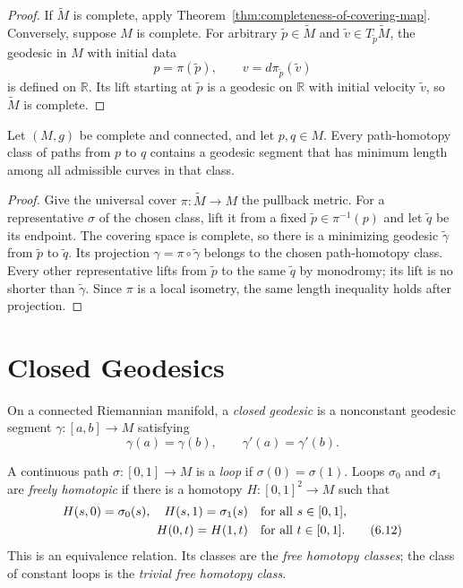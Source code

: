 \begin{proof}

\sketch If $\widetilde M$ is complete, apply
Theorem~\ref{thm:completeness-of-covering-map}. Conversely, suppose $M$ is
complete. For arbitrary $\widetilde p\in\widetilde M$ and
$\widetilde v\in T_{\widetilde p}\widetilde M$, the geodesic in $M$ with
initial data
\[
p=\pi(\widetilde p),
\qquad v=d\pi_{\widetilde p}(\widetilde v)
\]
is defined on $\mathbb R$. Its lift starting at $\widetilde p$ is a geodesic
on $\mathbb R$ with initial velocity $\widetilde v$, so $\widetilde M$ is
complete.
\end{proof}

\begin{proposition}
\label{prop:path-homotopy-contains-minimizing-geodesic}

Let $(M,g)$ be complete and connected, and let $p,q\in M$. Every
path-homotopy class of paths from $p$ to $q$ contains a geodesic segment that
has minimum length among all admissible curves in that class.
\end{proposition}

\begin{proof}
\sketch Give the universal cover $\pi\colon\widetilde M\to M$ the pullback
metric. For a representative $\sigma$ of the chosen class, lift it from a
fixed $\widetilde p\in\pi^{-1}(p)$ and let $\widetilde q$ be its endpoint.
The covering space is complete, so there is a minimizing geodesic
$\widetilde\gamma$ from $\widetilde p$ to $\widetilde q$. Its projection
$\gamma=\pi\circ\widetilde\gamma$ belongs to the chosen path-homotopy class.
Every other representative lifts from $\widetilde p$ to the same
$\widetilde q$ by monodromy; its lift is no shorter than
$\widetilde\gamma$. Since $\pi$ is a local isometry, the same length inequality
holds after projection.
\end{proof}

\section{Closed Geodesics}

On a connected Riemannian manifold, a \emph{closed geodesic} is a nonconstant
geodesic segment $\gamma\colon[a,b]\to M$ satisfying
\[
\gamma(a)=\gamma(b),
\qquad
\gamma'(a)=\gamma'(b).
\]

A continuous path $\sigma\colon[0,1]\to M$ is a \emph{loop} if
$\sigma(0)=\sigma(1)$. Loops $\sigma_0$ and $\sigma_1$ are \emph{freely
homotopic} if there is a homotopy $H\colon[0,1]^2\to M$ such that
\begin{align}
H(s,0)=\sigma_0(s),\quad H(s,1)=\sigma_1(s)
&\quad\text{for all }s\in[0,1], \notag\\
H(0,t)=H(1,t)&\quad\text{for all }t\in[0,1]. \tag{6.12}
\end{align}
This is an equivalence relation. Its classes are the \emph{free homotopy
classes}; the class of constant loops is the \emph{trivial free homotopy
class}.

